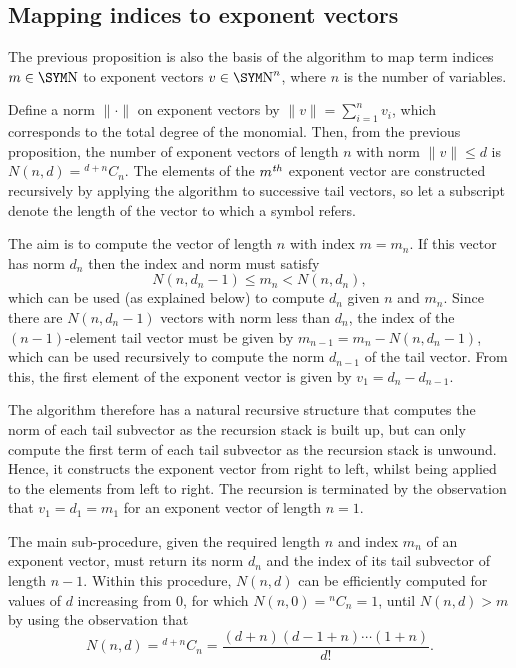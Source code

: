 \subsection{Mapping indices to exponent vectors}

The previous proposition is also the basis of the algorithm to map
term indices $m \in \N$ to exponent vectors $v \in \N^n$, where $n$ is
the number of variables.

Define a norm $\|\cdot\|$ on exponent vectors by $\|v\| = \sum_{i=1}^n
v_i$, which corresponds to the total degree of the monomial.  Then,
from the previous proposition, the number of exponent vectors of
length $n$ with norm $\|v\| \leq d$ is $N(n,d) = {}^{d+n}C_n$.  The
elements of the $m\mbox{$^{\it th}$}$ exponent vector are constructed recursively by
applying the algorithm to successive tail vectors, so let a subscript
denote the length of the vector to which a symbol refers.

The aim is to compute the vector of length $n$ with index $m = m_n$.
If this vector has norm $d_n$ then the index and norm must satisfy
\[
  N(n,d_n-1) \leq m_n < N(n,d_n),
\]
which can be used (as explained below) to compute $d_n$ given $n$ and
$m_n$.  Since there are $N(n,d_n-1)$ vectors with norm less than
$d_n$, the index of the $(n-1)$-element tail vector must be given by
$m_{n-1} = m_n - N(n,d_n-1)$, which can be used recursively to compute
the norm $d_{n-1}$ of the tail vector.  From this, the first element
of the exponent vector is given by $v_1 = d_n - d_{n-1}$.

The algorithm therefore has a natural recursive structure that
computes the norm of each tail subvector as the recursion stack is
built up, but can only compute the first term of each tail subvector
as the recursion stack is unwound.  Hence, it constructs the exponent
vector from right to left, whilst being applied to the elements from
left to right.  The recursion is terminated by the observation that
$v_1 = d_1 = m_1$ for an exponent vector of length $n = 1$.

The main sub-procedure, given the required length $n$ and index $m_n$
of an exponent vector, must return its norm $d_n$ and the index of its
tail subvector of length $n-1$.  Within this procedure, $N(n,d)$ can
be efficiently computed for values of $d$ increasing from 0, for which
$N(n,0) = {}^nC_n = 1$, until $N(n,d) > m$ by using the observation
that
\[
   N(n,d) = {}^{d+n}C_n = \frac{(d+n)(d-1+n)\cdots(1+n)}{d!}.
\]


